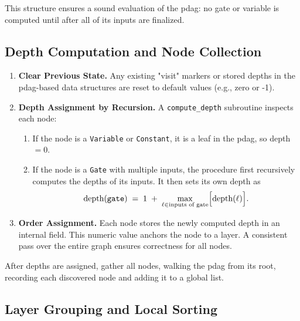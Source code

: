 This structure ensures a sound evaluation of the \acrshort{pdag}: no gate or variable is computed until after all of its inputs are finalized.

\subsection{Depth Computation and Node Collection}

\begin{enumerate}
    \item \textbf{Clear Previous State.}  
      Any existing "visit" markers or stored depths in the \acrshort{pdag}-based data structures are reset to default values (e.g., zero or -1).
      
    \item \textbf{Depth Assignment by Recursion.}  
      A \texttt{compute\_depth} subroutine inspects each node:
      \begin{enumerate}
        \item If the node is a \texttt{Variable} or \texttt{Constant}, it is a leaf in the \acrshort{pdag}, so depth \(=0\).  
        \item If the node is a \texttt{Gate} with multiple inputs, the procedure first recursively computes the depths of its inputs. It then sets its own depth as 
        \[
          \text{depth}(\texttt{gate})
          \;=\;
          1 \;+\;\max\limits_{\ell \in \text{inputs of gate}} \Bigl[\text{depth}(\ell)\Bigr].
        \]
      \end{enumerate}
    \item \textbf{Order Assignment.}  
      Each node stores the newly computed depth in an internal field. This numeric value anchors the node to a layer. A consistent pass over the entire graph ensures correctness for all nodes.
\end{enumerate}

After depths are assigned, gather all nodes, walking the \acrshort{pdag} from its root, recording each discovered node and adding it to a global list.

\subsection{Layer Grouping and Local Sorting}

